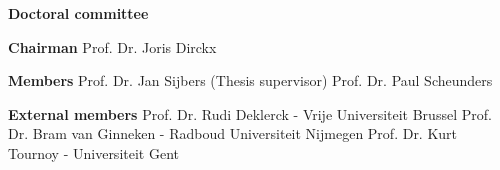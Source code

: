 \begin{flushleft}
\textbf{Doctoral committee} \linebreak

\textbf{Chairman} \linebreak
Prof. Dr. Joris Dirckx \linebreak

\textbf{Members} \linebreak
Prof. Dr. Jan Sijbers (Thesis supervisor) \linebreak
Prof. Dr. Paul Scheunders \linebreak

\textbf{External members} \linebreak
Prof. Dr. Rudi Deklerck - Vrije Universiteit Brussel \linebreak
Prof. Dr. Bram van Ginneken - Radboud Universiteit Nijmegen \linebreak
Prof. Dr. Kurt Tournoy - Universiteit Gent \linebreak
\end{flushleft}

\vfill



